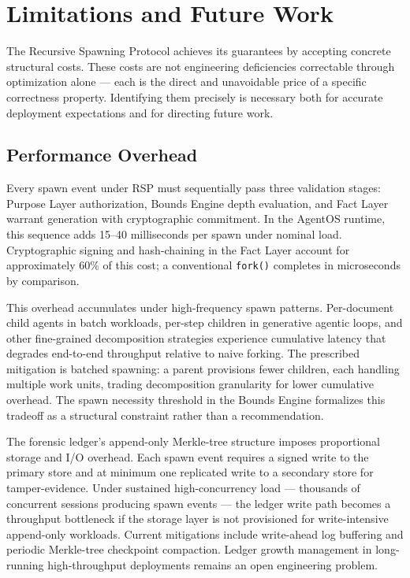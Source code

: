 \section{Limitations and Future Work}
\label{sec:rs-limitations}

The Recursive Spawning Protocol achieves its guarantees by accepting concrete structural costs. These costs are not engineering deficiencies correctable through optimization alone --- each is the direct and unavoidable price of a specific correctness property. Identifying them precisely is necessary both for accurate deployment expectations and for directing future work.

\subsection{Performance Overhead}
\label{sec:rs-perf-overhead}

Every spawn event under RSP must sequentially pass three validation stages: Purpose Layer authorization, Bounds Engine depth evaluation, and Fact Layer warrant generation with cryptographic commitment. In the AgentOS runtime, this sequence adds \numrange{15}{40} milliseconds per spawn under nominal load. Cryptographic signing and hash-chaining in the Fact Layer account for approximately 60\% of this cost; a conventional \texttt{fork()} completes in microseconds by comparison.

This overhead accumulates under high-frequency spawn patterns. Per-document child agents in batch workloads, per-step children in generative agentic loops, and other fine-grained decomposition strategies experience cumulative latency that degrades end-to-end throughput relative to naive forking. The prescribed mitigation is batched spawning: a parent provisions fewer children, each handling multiple work units, trading decomposition granularity for lower cumulative overhead. The spawn necessity threshold in the Bounds Engine formalizes this tradeoff as a structural constraint rather than a recommendation.

The forensic ledger's append-only Merkle-tree structure imposes proportional storage and I/O overhead. Each spawn event requires a signed write to the primary store and at minimum one replicated write to a secondary store for tamper-evidence. Under sustained high-concurrency load --- thousands of concurrent sessions producing spawn events --- the ledger write path becomes a throughput bottleneck if the storage layer is not provisioned for write-intensive append-only workloads. Current mitigations include write-ahead log buffering and periodic Merkle-tree checkpoint compaction. Ledger growth management in long-running high-throughput deployments remains an open engineering problem.

